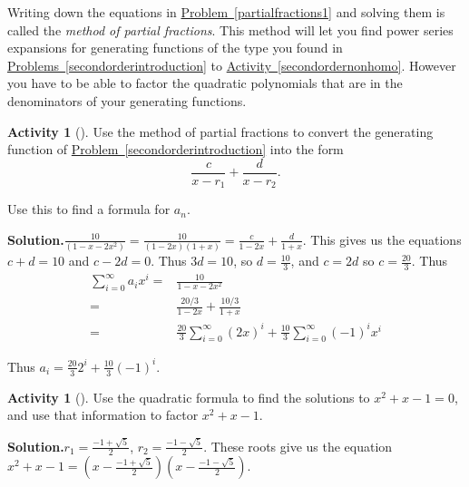 \documentclass[10pt,]{book}
\theoremstyle{plain}
\theoremstyle{definition}
\newtheorem{activity}[project]{Activity}
\numberwithin{equation}{chapter}
\newcommand{\amp}{&}
\begin{document}
Writing down the equations in \hyperref[partialfractions1]{Problem~\ref{partialfractions1}} and solving them is called the \emph{method of partial fractions}. This method will let you find power series expansions for generating functions of the type you found in \hyperref[secondorderintroduction]{Problems~\ref{secondorderintroduction}} to \hyperref[secondordernonhomo]{Activity~\ref{secondordernonhomo}}. However you have to be able to factor the quadratic polynomials that are in the denominators of your generating functions.%
\begin{activity}[]\label{activity-206}
Use the method of partial fractions to convert the generating function of \hyperref[secondorderintroduction]{Problem~\ref{secondorderintroduction}} into the form%
\begin{equation*}
\frac{c}{x-r_1} + \frac{d}{x-r_2}.
\end{equation*}
%
\par
Use this to find a formula for \(a_n\).%
\par\medskip\noindent%
\textbf{Solution.}\quad \(\frac{10}{(1-x-2x^2)}=\frac{10}{(1-2x)(1+x)} = \frac{c}{1-2x} +\frac{d}{1+x}\). This gives us the equations \(c+d=10\) and \(c-2d=0\). Thus \(3d=10\), so \(d=\frac{10}{3}\), and \(c=2d\) so \(c=\frac{20}{3}\). Thus%
\begin{align*}
\sum_{i=0}^\infty a_ix^i  =\amp  \frac{10}{1-x-2x^2}\\
=\amp \frac{20/3}{1-2x} + \frac{10/3}{1+x}\\
=\amp \frac{20}{3}\sum_{i=0}^\infty (2x)^i + \frac{10}{3}\sum_{i=0}^\infty (-1)^ix^i
\end{align*}
%
\par
Thus \(a_i=\frac{20}{3}2^i +\frac{10}{3}(-1)^i\).%
\end{activity}
\begin{activity}[]\label{factorFibonacci}
Use the quadratic formula to find the solutions to \(x^2+x-1=0\), and use that information to factor \(x^2+x-1\).%
\par\medskip\noindent%
\textbf{Solution.}\quad \(r_1=\frac{-1+\sqrt{5}}{2}\), \(r_2 = \frac{-1-\sqrt{5}}{2}\). These roots give us the equation \(x^2+x-1=(x-\frac{-1+\sqrt{5}}{2})(x-\frac{-1-\sqrt{5}}{2})\).%
\end{activity}
\end{document}
